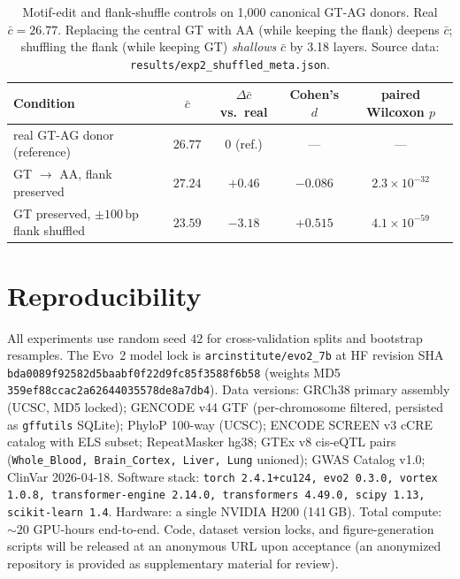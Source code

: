 \documentclass{article}
\theoremstyle{plain}
\theoremstyle{definition}
\theoremstyle{remark}
\begin{document}
\begin{table}[!htbp]
\caption{Motif-edit and flank-shuffle controls on 1{,}000 canonical
GT-AG donors. Real $\bar c\!=\!26.77$. Replacing the central GT with AA
(while keeping the flank) deepens $\bar c$; shuffling the flank
(while keeping GT) \emph{shallows} $\bar c$ by 3.18 layers. Source data:
\texttt{results/exp2\_shuffled\_meta.json}.}
\label{tab:motif-flank}
\centering
\small
\begin{tabular}{@{}lcccc@{}}
\toprule
Condition & $\bar c$ & $\Delta \bar c$ vs.\ real & Cohen's $d$ & paired Wilcoxon $p$ \\
\midrule
real GT-AG donor (reference)             & $26.77$ & $0$ (ref.)   & ---     & --- \\
GT $\to$ AA, flank preserved             & $27.24$ & $+0.46$      & $-0.086$ & $2.3\!\times\!10^{-32}$ \\
GT preserved, $\pm 100$\,bp flank shuffled & $23.59$ & $\mathbf{-3.18}$ & $\mathbf{+0.515}$ & $4.1\!\times\!10^{-59}$ \\
\bottomrule
\end{tabular}
\end{table}

\section{Reproducibility}
\label{app:repro}

All experiments use random seed $42$ for cross-validation splits and
bootstrap resamples. The Evo~2 model lock is
\texttt{arcinstitute/evo2\_7b} at HF revision SHA
\texttt{bda0089f92582d5baabf0f22d9fc85f3588f6b58} (weights MD5
\texttt{359ef88ccac2a62644035578de8a7db4}). Data versions:
GRCh38 primary assembly (UCSC, MD5 locked); GENCODE v44 GTF
(per-chromosome filtered, persisted as \texttt{gffutils} SQLite);
PhyloP 100-way (UCSC); ENCODE SCREEN v3 cCRE catalog with ELS subset;
RepeatMasker hg38; GTEx v8 cis-eQTL pairs (\texttt{Whole\_Blood,
Brain\_Cortex, Liver, Lung} unioned); GWAS Catalog v1.0; ClinVar
2026-04-18. Software stack: \texttt{torch 2.4.1+cu124, evo2 0.3.0,
vortex 1.0.8, transformer-engine 2.14.0, transformers 4.49.0, scipy
1.13, scikit-learn 1.4}. Hardware: a single NVIDIA H200 (141\,GB).
Total compute: $\sim 20$ GPU-hours end-to-end. Code, dataset version
locks, and figure-generation scripts will be released at an anonymous
URL upon acceptance (an anonymized repository is provided as
supplementary material for review).
\end{document}
